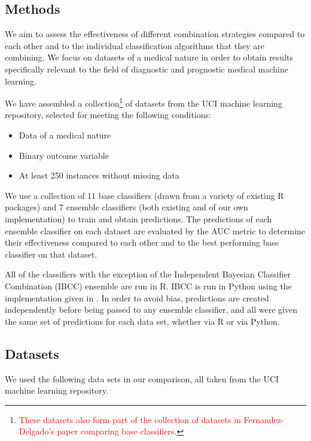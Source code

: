 \documentclass{bioinfo}
\begin{document}
\begin{methods}
\section{Methods}

 We aim to assess the effectiveness of different combination strategies compared to each other and to the individual classification algorithms that they are combining.  We focus on datasets of a medical nature in order to obtain results specifically relevant to the field of diagnostic and prognostic medical machine learning.

We have assembled a collection\footnote{\textcolor{red}{These datasets also form part of the collection of datasets in Fernandez-Delgado's paper \cite{classifiercomparison} comparing base classifiers.}} of datasets from the UCI machine learning repository, selected for meeting the following conditions:

\begin{itemize}
\item Data of a medical nature
\item Binary  outcome variable
\item At least 250 instances without missing data
\end{itemize}

\noindent
We use a collection of 11 base classifiers (drawn from a variety of existing R packages) and 7 ensemble classifiers (both existing and of our own implementation) to train and obtain predictions. The predictions of each ensemble classifier on each dataset are evaluated by the AUC metric to determine their effectiveness compared to each other and to the best performing base classifier on that dataset.

All of the classifiers with the exception of the Independent Bayesian Classifier Combination (IBCC) ensemble are run in R. IBCC is run in Python using the implementation given in \cite{Simpson13}. In order to avoid bias, predictions are created independently before being passed to any ensemble classifier, and all were given the same set of predictions for each data set, whether via R or via Python.


\subsection{Datasets}

We  used the following data sets in our comparison, all taken from the UCI machine learning repository\cite{UCIrep}.


\end{methods}
\end{document}
